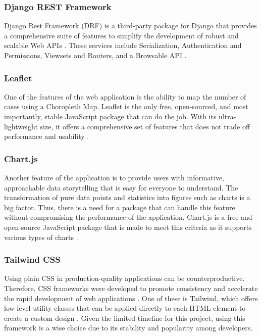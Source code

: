 \subsubsection{Django REST Framework}
Django Rest Framework (DRF) is a third-party package for Django that provides a comprehensive suite of features to simplify the development of robust and scalable Web APIs \cite{christie-no-date}. These services include Serialization, Authentication and Permissions, Viewsets and Routers, and a Browsable API . 

\subsubsection{Leaflet}
One of the features of the web application is the ability to map the number of cases using a Choropleth Map. Leaflet is the only free, open-sourced, and most importantly, stable JavaScript package that can do the job. With its ultra-lightweight size, it offers a comprehensive set of features that does not trade off performance and usability \cite{leaflet-no-date}. 

\subsubsection{Chart.js}
Another feature of the application is to provide users with informative, approachable data storytelling that is easy for everyone to understand. The transformation of pure data points and statistics into figures such as charts is a big factor. Thus, there is a need for a package that can handle this feature without compromising the performance of the application. Chart.js is a free and open-source JavaScript package that is made to meet this criteria as it supports various types of charts \cite{chartjs-no-date}. 

\subsubsection{Tailwind CSS}
Using plain CSS in production-quality applications can be counterproductive. Therefore, CSS frameworks were developed to promote consistency and accelerate the rapid development of web applications \cite{joel-2021}. One of these is Tailwind, which offers low-level utility classes that can be applied directly to each HTML element to create a custom design \cite{tailwind-no-date}. Given the limited timeline for this project, using this framework is a wise choice due to its stability and popularity among developers.

